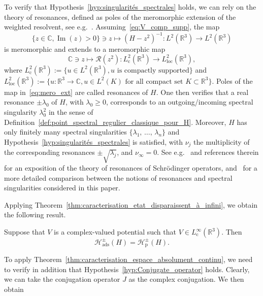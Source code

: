 \documentclass[10pt]{amsart}
\theoremstyle{definition}\newtheorem{defi}[theo]{Definition}\newtheorem{rema}[theo]{Remark}\newtheorem{exam}[theo]{Example}\newtheorem{exem}[theo]{Example}\newtheorem{nota}[theo]{Notation}
\newcommand{\Hi}{\mathcal{H}}
\newcommand{\bbC}{\mathbb{C}}
\newcommand{\R}{\mathbb{R}}
\newcommand{\rmp}{\mathrm{p}}
\newcommand{\ads}{\mathrm{ads}}
\newcommand{\rmc}{\mathrm{c}}
\newcommand{\Res}{\mathcal{R}}
\DeclareMathOperator{\im}{Im}
\begin{document}
To verify that Hypothesis~\ref{hyp:singularités_spectrales} holds, we can rely on the theory of resonances, defined as poles of the meromorphic extension of the weighted resolvent, see e.g.~\cite{DyZw19_01}. Assuming~\eqref{eq:V_comp_supp}, the map
\begin{equation*}
\{ z \in \bbC, \im(z) > 0 \} \ni z \mapsto \left(H - z^2\right)^{-1} : L^2(\R^3) \to L^2(\R^3)
\end{equation*}
is meromorphic and extends to a meromorphic map
\begin{equation}\label{eq:mero_ext}
\bbC \ni z \mapsto \Res(z^2) : L^2_{ \rmc }(\R^3) \to L^2_{ \mathrm{loc} }(\R^3), 
\end{equation}
where $L^2_{\rmc}(\R^3):=\{u\in L^2(\R^3),u\text{ is compactly supported} \}$ and $L^2_{\mathrm{loc}}(\R^3) :=\{u:\R^3\to\bbC,u\in L^2(K) \text{ for all compact set } K \subset \R^3 \}$. Poles of the map in~\eqref{eq:mero_ext} are called resonances of $H$. One then verifies that a real resonance $\pm\lambda_0$ of $H$, with $\lambda_0\ge0$, corresponds to an outgoing/incoming spectral singularity $\lambda_0^2$ in the sense of Definition~\ref{def:point_spectral_regulier_classique_pour_H}. Moreover, $H$ has only finitely many spectral singularities $\{\lambda_1,\,\dots,\,\lambda_n\}$ and Hypothesis~\ref{hyp:singularités_spectrales} is satisfied, with $\nu_j$ the multiplicity of the corresponding resonances $\pm\sqrt{\lambda_j}$, and $\nu_\infty=0$. See e.g.~\cite{DyZw19_01} and references therein for an exposition of the theory of resonances of Schr\"odinger operators, and~\cite[Section~6]{FaFr18_01} for a more detailed comparison between the notions of resonances and spectral singularities considered in this paper.

Applying Theorem~\ref{thm:caracterisation_etat_disparaissent_à_infini}, we obtain the following result.

\begin{prop}\label{prop:schr_ads}
Suppose that $V$ is a complex-valued potential such that $V \in L^\infty_{ \rmc }(\R^3)$. Then
\begin{equation*}
\Hi^\pm_{\ads}(H)=\Hi_{\rmp}^\pm(H).
\end{equation*}
\end{prop}

To apply Theorem~\ref{thm:caracterisation_espace_absolument_continu}, we need to verify in addition that Hypothesis~\ref{hyp:Conjugate_operator} holds. Clearly, we can take the conjugation operator $J$ as the complex conjugation. We then obtain
\end{document}
